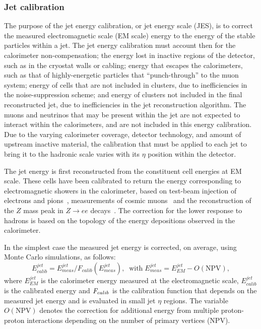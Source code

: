 \subsubsection{Jet calibration}\label{sec:calib}

The purpose of the jet energy calibration, or jet energy scale (JES), is to correct the measured electromagnetic scale (EM scale) energy to the energy of the stable particles within a jet.  The jet energy calibration must account then for the calorimeter non-compensation; the energy lost in inactive regions of the detector, such as in the cryostat walls or cabling; energy that escapes the calorimeters, such as that of highly-energetic particles that ``punch-through'' to the muon system; energy of cells that are not included in clusters, due to inefficiencies in the noise-suppression scheme; and energy of clusters not included in the final reconstructed jet, due to inefficiencies in the jet reconstruction algorithm. The muons and neutrinos that may be present within the jet are not expected to interact within the calorimeters, and are not included in this energy calibration.
Due to the varying calorimeter coverage, detector technology, and amount of upstream inactive material, the calibration that must be applied to each jet to bring it to the hadronic scale varies with its $\eta$ position within the detector. 

The jet energy is first reconstructed from the constituent cell energies at EM scale. These cells have been calibrated to return the energy corresponding to electromagnetic showers in the calorimeter, based on test-beam injection of electrons and pions~\cite{Aharrouche2006601},  measurements of cosmic muons~\cite{Cooke:1071187} and the reconstruction of the $Z$ mass peak in $Z \rightarrow ee$ decays~\cite{Aad:2011mk}. The correction for the lower response to hadrons is based on the topology of the energy depositions observed in the calorimeter. 

In the simplest case the measured jet energy is corrected, on average, using Monte Carlo simulations, as follows:
%
\begin{equation}
E^{jet}_{calib} = E^{jet}_{meas} /F_{calib}(E^{jet}_{meas}),\; \; \mbox{with} \;  E^{jet}_{meas} = E^{jet}_{EM} - O(\mbox{NPV}),
\end{equation}
%
where $E^{jet}_{EM}$ is the calorimeter energy measured at the electromagnetic scale, $E^{jet}_{calib}$ is the calibrated energy and $\emph{F}_{calib}$ is the calibration function that depends on the measured jet energy and is evaluated in small jet $\eta$ regions. The variable $ O(\mbox{NPV})$ denotes the correction for additional energy from multiple proton-proton interactions depending on the number of primary vertices (NPV).

